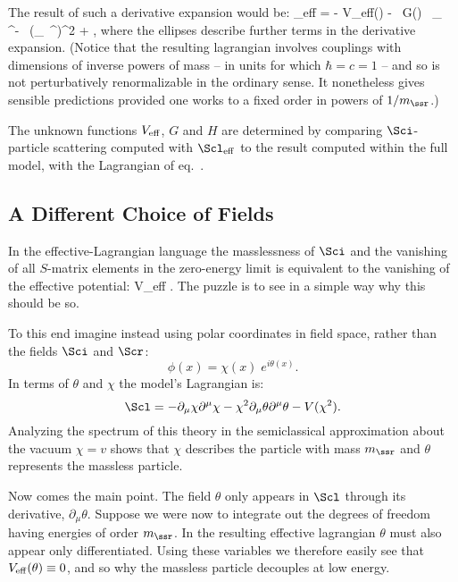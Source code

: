 \documentclass[12pt]{article}
\def\hf{{\frac12}}
\def\eq{\begin{equation}}
\def\eeq{\end{equation}}
\begin{document}
The result of such a derivative expansion would be:
%
\bg
\label{dexp1}
\Scl_{\rm eff} = - V_{\rm eff}(\Sci) - \; \hf \, G(\Sci)
\, \partial_\mu \Sci \, \partial^\mu \Sci - 
\, (\partial_\mu \Sci \, \partial^\mu \Sci )^2 + \cdots,
\nd
%
where the ellipses describe further terms in the derivative
expansion. (Notice that the resulting lagrangian involves 
couplings with dimensions of inverse powers of mass --
in units for which $\hbar = c = 1$ -- and so is not
perturbatively renormalizable in the ordinary sense. It
nonetheless gives sensible predictions provided one works
to a fixed order in powers of $1/m_\ssr$.) 

The unknown functions $V_{\rm eff}$, $G$ and $H$ are 
determined by comparing $\Sci$-particle scattering computed
with $\Scl_{\rm eff}$ to the result computed within the full
model, with the Lagrangian of eq.~. 

\subsection{A Different Choice of Fields}

In the effective-Lagrangian language the masslessness of
$\Sci$ and the vanishing of all $S$-matrix elements in the 
zero-energy limit is equivalent to the vanishing of the effective 
potential: 
%
\bg
\label{Vis0}
V_{\rm eff} . 
\nd
%
The puzzle is to see in a simple way why this should be so.

To this end imagine instead using polar coordinates in field space,
rather than the fields $\Sci$ and $\Scr$:
%
\eq
\label{polcoords}
\phi(x) = \chi(x) \; e^{i \theta(x)} .
\eeq
%
In terms of $\theta$ and $\chi$ the model's Lagrangian is: 
%
\eq
\label{linpolcoords}
\Scl = - \partial_\mu \chi \partial^\mu \chi - \chi^2 \partial_\mu \theta
\partial^\mu \theta - V(\chi^2).
\eeq
%
Analyzing the spectrum of this theory in the semiclassical approximation
about the vacuum $\chi = v$ shows that $\chi$ describes the particle
with mass $m_\ssr$ and $\theta$ represents the massless particle. 

Now comes the main point. The field $\theta$ only appears in $\Scl$
through its derivative, $\partial_\mu \theta$. Suppose we were now
to integrate out the degrees of freedom having energies of order
$m_\ssr$. In the resulting effective lagrangian $\theta$ must also
appear only differentiated. Using these variables we therefore 
easily see that $V_{\rm eff}(\theta) \equiv 0$, and so why the
massless particle decouples at low energy.
\end{document}
